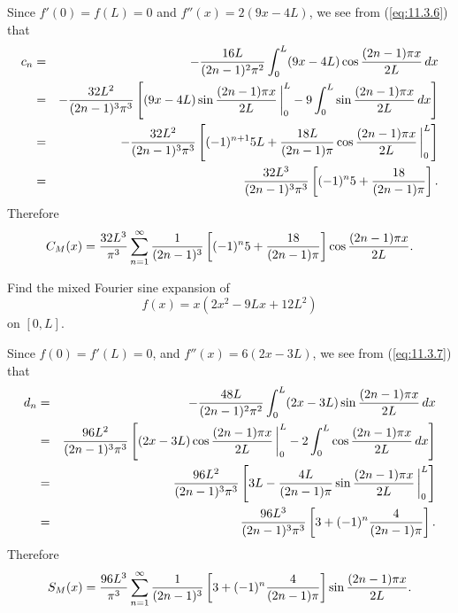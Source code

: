 \begin{examplesolution}
\solution Since $f'(0)=f(L)=0$ and $f''(x)=2(9x-4L)$, we see from (\ref{eq:11.3.6}) that
\begin{eqnarray*}
  c_{n} & = & -\frac{16L}{(2n-1)^{2}\pi^{2}}\int_{0}^{L}(9x-4L)\cos\frac{(2n-1)\pi x}{2L}\,dx                                                     \\
        & = & -\frac{32L^{2}}{(2n-1)^{3}\pi^{3}}\left[(9x-4L)\sin\frac{(2n-1)\pi x}{2L}\,\bigg|_{0}^{L}-9\int_{0}^{L}\sin\frac{(2n-1)\pi x}{2L}\,dx\right] \\
        & = & -\frac{32L^{2}}{(2n-1)^{3}\pi^{3}}\left[(-1)^{n+1}5L+\frac{18L}{(2n-1)\pi}\cos\frac{(2n-1)\pi x}{2L}\,\bigg|_{0}^{L}\right]                  \\
        & = & \frac{32L^{3}}{(2n-1)^{3}\pi^{3}}\left[(-1)^{n}5+\frac{18}{(2n-1)\pi}\right].
\end{eqnarray*}
Therefore
\[
  C_{M}(x)=\displaystyle\frac{32L^{3}}{\pi^{3}}\sum_{n=1}^{\infty}\frac{1}{(2n-1)^{3}}\left[ (-1)^{n}5+\frac{18}{(2n-1)\pi}\right]\cos\frac{(2n-1)\pi x}{2L}.
\]
\end{examplesolution}

\begin{example}
  \label{example:11.3.8} \rm Find the mixed Fourier sine expansion of
  \[
    f(x)=x(2x^{2}-9Lx+12L^{2})
  \]
  on $[0,L]$.
\end{example}

\begin{examplesolution}
\solution Since $f(0)=f'(L)=0$, and $f''(x)=6(2x-3L)$, we see from (\ref{eq:11.3.7}) that
\begin{eqnarray*}
  d_{n} & = & -\displaystyle\frac{48L}{(2n-1)^{2}\pi^{2}}\int_{0}^{L}(2x-3L)\sin\frac{(2n-1)\pi x}{2L}\,dx                                                    \\
        & = & \displaystyle\frac{96L^{2}}{(2n-1)^{3}\pi^{3}}\left[(2x-3L)\cos\frac{(2n-1)\pi x}{2L}\,\bigg|_{0}^{L}-2\int_{0}^{L}\cos\frac{(2n-1)\pi x}{2L}\,dx\right] \\
        & = & \displaystyle\frac{96L^{2}}{(2n-1)^{3}\pi^{3}}\left[3L-\frac{4L}{(2n-1)\pi}\sin\frac{(2n-1)\pi x}{2L}\,\bigg|_{0}^{L}\right]                             \\
        & = & \displaystyle\frac{96L^{3}}{(2n-1)^{3}\pi^{3}}\left[3+(-1)^{n}\frac{4}{(2n-1)\pi}\right].
\end{eqnarray*}
Therefore
\[
  S_{M}(x) =\displaystyle\frac{96L^{3}}{\pi^{3}}\sum_{n=1}^{\infty}\frac{1}{(2n-1)^{3}}\left[3+(-1)^{n}\frac{4}{(2n-1)\pi}\right]\sin\frac{(2n-1)\pi x}{2L}.
\]
\end{examplesolution}

